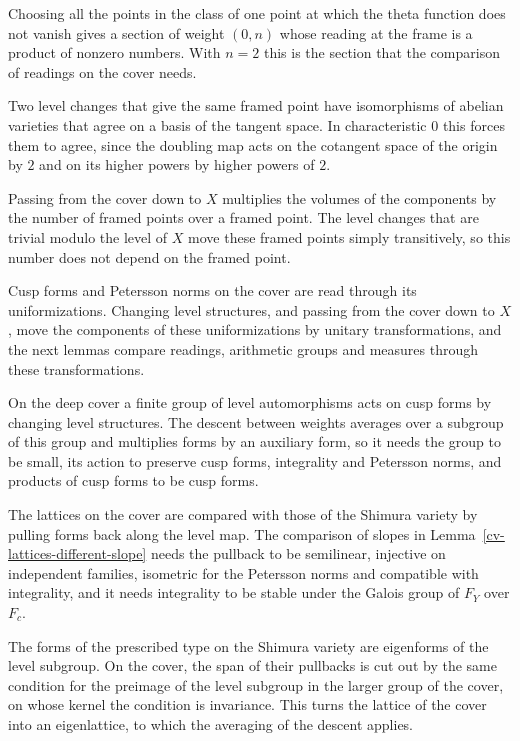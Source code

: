 Choosing all the points in the class of one point at which the theta function does not vanish gives a section of
weight $(0,n)$ whose reading at the frame is a product of nonzero numbers. With $n=2$ this is the section that the
comparison of readings on the cover needs.

Two level changes that give the same framed point have isomorphisms of abelian varieties that agree on a basis of
the tangent space. In characteristic $0$ this forces them to agree, since the doubling map acts on the cotangent
space of the origin by $2$ and on its higher powers by higher powers of $2$.

Passing from the cover down to $X$ multiplies the volumes of the components by the number of framed points over a
framed point. The level changes that are trivial modulo the level of $X$ move these framed points simply
transitively, so this number does not depend on the framed point.

Cusp forms and Petersson norms on the cover are read through its uniformizations. Changing level
structures, and passing from the cover down to $X$, move the components of these uniformizations by
unitary transformations, and the next lemmas compare readings, arithmetic groups and measures through
these transformations.

On the deep cover a finite group of level automorphisms acts on cusp forms by changing level
structures. The descent between weights averages over a subgroup of this group and multiplies forms
by an auxiliary form, so it needs the group to be small, its action to preserve cusp forms,
integrality and Petersson norms, and products of cusp forms to be cusp forms.

The lattices on the cover are compared with those of the Shimura variety by pulling forms back along
the level map. The comparison of slopes in Lemma~\ref{cv-lattices-different-slope} needs the pullback
to be semilinear, injective on independent families, isometric for the Petersson norms and
compatible with integrality, and it needs integrality to be stable under the Galois group of $F_Y$
over $F_c$.

The forms of the prescribed type on the Shimura variety are eigenforms of the level subgroup. On the
cover, the span of their pullbacks is cut out by the same condition for the preimage of the level
subgroup in the larger group of the cover, on whose kernel the condition is invariance. This turns
the lattice of the cover into an eigenlattice, to which the averaging of the descent applies.

